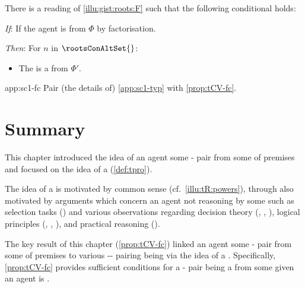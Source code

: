 \begin{note}
  \begin{application}%
    \label{app:sc1-fc}%
    There is a reading of \autoref{illu:gist:roots:F} such that the following conditional holds:
    \begin{itenum}
    \item[\emph{If}:]
      If the agent is \tCV{}  from \(\Phi\) by factorisation.
    \item[\emph{Then}:]
      For \(n\) in  \(\rootsConAltSet{}\):
      \begin{itemize}
      \item
        The  is a \fc{} from \(\Phi'\).
      \end{itemize}
    \end{itenum}
    \vspace{-\baselineskip}
  \end{application}

  \begin{dets}{app:sc1-fc}
    Pair (the details of) \autoref{app:sc1-typ} with \autoref{prop:tCV-fc}.
  \end{dets}
\end{note}


\section*{Summary}

\begin{note}
  This chapter introduced the idea of an agent \tCV{} some - pair from some \pool{} of premises and focused on the idea of a \tprof{} (\autoref{def:tpro}).

  The idea of a \tpro{} is motivated by common sense (cf.\ \autoref{illu:tR:powers}), through also motivated by arguments which concern an agent not reasoning by some \torN{} such as selection tasks (\cite{Wason:1966aa}) and various observations regarding decision theory (\cite{Allais:1979aa}, \cite{Ellsberg:1961aa}, \cite{Quinn:1990aa}), logical principles (\cite{Makinson:1965aa}, \cite{Kyburg:1997aa}, \cite{Harman:1984aa}), and practical reasoning (\cite{Bratman:1981aa,Bratman:1987aa}).
\end{note}


\begin{note}
  The key result of this chapter (\autoref{prop:tCV-fc}) linked an agent \tCV{} some - pair from some \pool{} of premises to various -- pairing being  via the idea of a \tpro{}.
  Specifically, \autoref{prop:tCV-fc} provides sufficient conditions for a - pair being a \fc{} from some \pool{} given an agent is \tCV{}.
\end{note}







